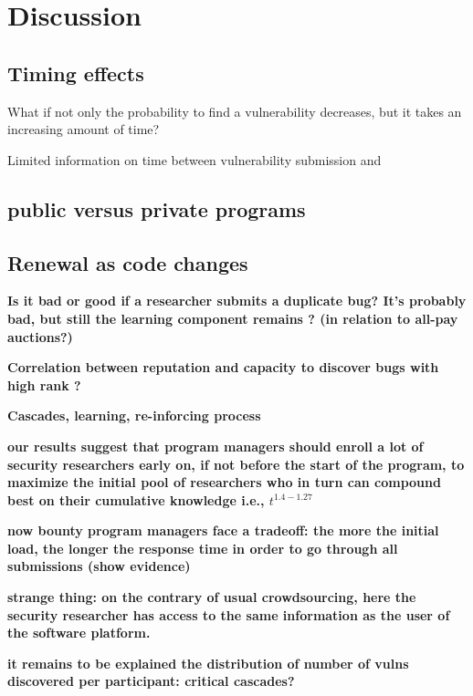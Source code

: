 \section{Discussion}
\label{sec:discussion}


\subsection{Timing effects}

What if not only the probability to find a vulnerability decreases, but it takes an increasing amount of time? 



Limited information on time between vulnerability submission and 


\subsection{public versus private programs}


\subsection{Renewal as code changes}



{\bf Is it bad or good if a researcher submits a duplicate bug?  It's probably bad, but still the learning component remains ? (in relation to all-pay auctions?)}



{\bf Correlation between reputation and capacity to discover bugs with high rank ?}

{\bf Cascades, learning, re-inforcing process}

{\bf our results suggest that program managers should enroll a lot of security researchers early on, if not before the start of the program, to maximize the initial pool of researchers who in turn can compound best on their cumulative knowledge i.e., $t^{1.4 - 1.27}$}

{\bf now bounty program managers face a tradeoff: the more the initial load, the longer the response time in order to go through all submissions (show evidence)}

{\bf strange thing: on the contrary of usual crowdsourcing, here the security researcher has access to the same information as the user of the software platform.}


{\bf it remains to be explained the distribution of number of vulns discovered per participant: critical cascades?}




